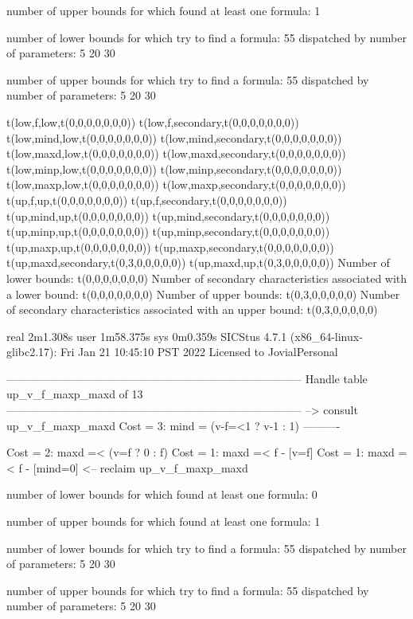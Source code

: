 number of upper bounds for which found at least one formula: 1

number of lower bounds for which try to find a formula: 55
dispatched by number of parameters: 5  20  30

number of upper bounds for which try to find a formula: 55
dispatched by number of parameters: 5  20  30

t(low,f,low,t(0,0,0,0,0,0,0))
t(low,f,secondary,t(0,0,0,0,0,0,0))
t(low,mind,low,t(0,0,0,0,0,0,0))
t(low,mind,secondary,t(0,0,0,0,0,0,0))
t(low,maxd,low,t(0,0,0,0,0,0,0))
t(low,maxd,secondary,t(0,0,0,0,0,0,0))
t(low,minp,low,t(0,0,0,0,0,0,0))
t(low,minp,secondary,t(0,0,0,0,0,0,0))
t(low,maxp,low,t(0,0,0,0,0,0,0))
t(low,maxp,secondary,t(0,0,0,0,0,0,0))
t(up,f,up,t(0,0,0,0,0,0,0))
t(up,f,secondary,t(0,0,0,0,0,0,0))
t(up,mind,up,t(0,0,0,0,0,0,0))
t(up,mind,secondary,t(0,0,0,0,0,0,0))
t(up,minp,up,t(0,0,0,0,0,0,0))
t(up,minp,secondary,t(0,0,0,0,0,0,0))
t(up,maxp,up,t(0,0,0,0,0,0,0))
t(up,maxp,secondary,t(0,0,0,0,0,0,0))
t(up,maxd,secondary,t(0,3,0,0,0,0,0))
t(up,maxd,up,t(0,3,0,0,0,0,0))
Number of lower bounds:                                             t(0,0,0,0,0,0,0)
Number of secondary characteristics associated with a lower bound:  t(0,0,0,0,0,0,0)
Number of upper bounds:                                             t(0,3,0,0,0,0,0)
Number of secondary characteristics associated with an upper bound: t(0,3,0,0,0,0,0)

real	2m1.308s
user	1m58.375s
sys	0m0.359s
SICStus 4.7.1 (x86_64-linux-glibc2.17): Fri Jan 21 10:45:10 PST 2022
Licensed to JovialPersonal


--------------------------------------------------------------------------------
Handle table up_v_f_maxp_maxd of 13
--------------------------------------------------------------------------------
--> consult up_v_f_maxp_maxd
Cost =  3:  mind = (v-f=<1 ? v-1 : 1)
----------

Cost =  2:  maxd =< (v=f ? 0 : f)
Cost =  1:  maxd =< f - [v=f] %
Cost =  1:  maxd =< f - [mind=0] %
<-- reclaim up_v_f_maxp_maxd

number of lower bounds for which found at least one formula: 0

number of upper bounds for which found at least one formula: 1

number of lower bounds for which try to find a formula: 55
dispatched by number of parameters: 5  20  30

number of upper bounds for which try to find a formula: 55
dispatched by number of parameters: 5  20  30

